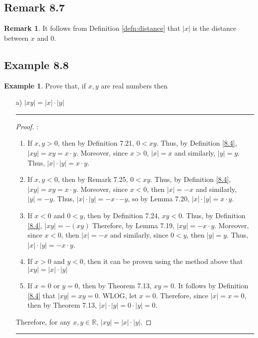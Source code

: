 \documentclass[openany, amssymb, psamsfonts]{amsart}
\newcommand{\bbR}{\mathbb{R}}
\newcommand{\abs}[1]{\lvert #1 \rvert}
\theoremstyle{definition}
\newtheorem{exmp}{Example}[section]
\newtheorem{rem}{Remark}[section]
\numberwithin{equation}{section}
\begin{document}
\subsection*{Remark 8.7}
\begin{rem}
It follows from Definition \ref{defn:distance} that $|x|$ is the distance between $x$ and $0.$
\end{rem}

\subsection*{Example 8.8}
\begin{exmp} \label{8.8} Prove that, if $x,y$ are real numbers then
\begin{enumerate}
\item[a)] $|xy|=|x|\cdot |y|$
\vspace{4pt}     \hrule   \vspace{4pt} \begin{proof} :\\
\begin{enumerate}
    \item If $x,y >0$, then by Definition 7.21, $0<xy$. Thus, by Definition \ref{8.4}, $\abs{xy} = xy = x\cdot y$. Moreover, since $x>0$, $\abs{x} = x$ and similarly, $\abs{y} = y$. Thus, $\abs{x}\cdot \abs{y} = x\cdot y$. 
    \item If $x,y<0$, then by Remark 7.25, $0<xy$. Thus, by Definition \ref{8.4}, $\abs{xy} = xy = x\cdot y$. Moreover, since $x<0$, then $\abs{x} = -x$ and similarly, $\abs{y} = -y$. Thus, $\abs{x}\cdot \abs{y} = -x\cdot -y$, so by Lemma 7.20, $\abs{x}\cdot \abs{y} = x\cdot y$.
    \item If $x<0$ and $0<y$, then by Definition 7.24, $xy<0$. Thus, by Definition \ref{8.4}, $\abs{xy} = -(xy)$ Therefore, by Lemma 7.19, $\abs{xy} = -x\cdot y$. Moreover, since $x<0$, then $\abs{x} = -x$ and similarly, since $0<y$, then $\abs{y} = y$. Thus, $\abs{x}\cdot \abs{y} = -x\cdot y$.
    \item If $x>0$ and $y<0$, then it can be proven using the method above that $\abs{xy} = \abs{x}\cdot \abs{y}$
    \item  If $x=0$ or $y=0$, then by Theorem 7.13, $xy = 0$. It follows by Definition \ref{8.4} that $\abs{xy}=xy = 0$. WLOG, let $x=0$. Therefore, since $\abs{x}=x=0$, then by Theorem 7.13, $\abs{x}\cdot \abs{y} = 0\cdot \abs{y} = 0$. 
\end{enumerate}
Therefore, for any $x,y\in \bbR$, $\abs{xy} = \abs{x}\cdot \abs{y}$.
\end{proof} \vspace{4pt}     \hrule   \vspace{4pt}

\end{enumerate}
\end{exmp}
\end{document}
